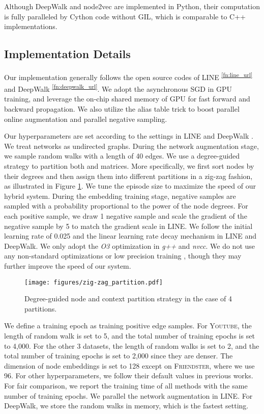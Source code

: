 \documentclass[sigconf]{acmart}
\newcommand{\dataset}[1]{\textsc{#1}\xspace}
\begin{document}
Although DeepWalk and node2vec are implemented in Python, their computation is fully paralleled by Cython code without GIL, which is comparable to C++ implementations.

\subsection{Implementation Details}

Our implementation generally follows the open source codes of LINE \textsuperscript{\ref{fn:line_url}} and DeepWalk \textsuperscript{\ref{fn:deepwalk_url}}. We adopt the asynchronous SGD \cite{recht2011hogwild} in GPU training, and leverage the on-chip shared memory of GPU for fast forward and backward propagation. We also utilize the alias table trick \cite{tang2015line, grover2016node2vec} to boost parallel online augmentation and parallel negative sampling.

Our hyperparameters are set according to the settings in LINE \cite{tang2015line} and DeepWalk \cite{perozzi2014deepwalk}. We treat networks as undirected graphs. During the network augmentation stage, we sample random walks with a length of 40 edges. We use a degree-guided strategy to partition both  and  matrices. More specifically, we first sort nodes by their degrees and then assign them into different partitions in a zig-zag fashion, as illustrated in Figure \ref{fig:zig-zag_partition}. We tune the episode size to maximize the speed of our hybrid system. During the embedding training stage, negative samples are sampled with a probability proportional to the  power of the node degrees. For each positive sample, we draw 1 negative sample and scale the gradient of the negative sample by 5 to match the gradient scale in LINE. We follow the initial learning rate of 0.025 and the linear learning rate decay mechanism in LINE and DeepWalk. We only adopt the \textit{O3} optimization in \textit{g++} and \textit{nvcc}. We do not use any non-standard optimizations or low precision training \cite{zhou2016dorefa, micikevicius2017mixed}, though they may further improve the speed of our system.

\begin{figure}[!h]
    \centering
    \texttt{[image: figures/zig-zag\_partition.pdf]}
    \caption{Degree-guided node and context partition strategy in the case of 4 partitions.}
    \label{fig:zig-zag_partition}
\end{figure}

We define a training epoch as training  positive edge samples. For \dataset{Youtube}, the length of random walk is set to 5, and the total number of training epochs is set to 4,000. For the other 3 datasets, the length of random walks is set to 2, and the total number of training epochs is set to 2,000 since they are denser. The dimension of node embeddings is set to 128 except on \dataset{Friendster}, where we use 96. For other hyperparameters, we follow their default values in previous works. For fair comparison, we report the training time of all methods with the same number of training epochs. We parallel the network augmentation in LINE. For DeepWalk, we store the random walks in memory, which is the fastest setting.
\end{document}
